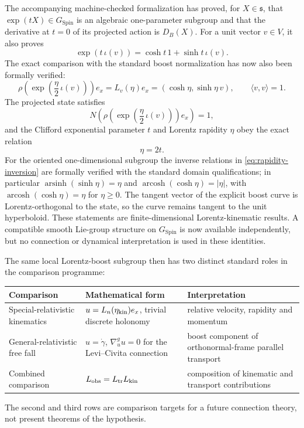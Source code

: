 \documentclass[11pt,a4paper]{article}
\theoremstyle{remark}
\newcommand{\SpinG}{G_{\mathrm{Spin}}}
\begin{document}
The accompanying machine-checked formalization has proved, for \(X\in\mathfrak s\), that \(\exp(tX)\in\SpinG\) is an algebraic one-parameter subgroup and that the derivative at \(t=0\) of its projected action is \(D_B(X)\).  For a unit vector \(v\in V\), it also proves
\begin{equation}
  \exp(t\,\iota(v))
  =\cosh t\,1+\sinh t\,\iota(v).
\tag{3.11}\label{eq:grade-one-exp}
\end{equation}
The exact comparison with the standard boost normalization has now also been formally verified:
\begin{equation}
  \rho\!\left(\exp\!\left(\frac{\eta}{2}\,\iota(v)\right)\right)e_x
  =L_v(\eta)e_x
  =(\cosh\eta,\sinh\eta\,v),
  \qquad
  \langle v,v\rangle=1.
\tag{3.12}\label{eq:spin-rapidity-target}
\end{equation}
The projected state satisfies
\[
  N\!\left(\rho\!\left(\exp\!\left(\frac{\eta}{2}\,\iota(v)\right)\right)e_x\right)=1,
\]
and the Clifford exponential parameter \(t\) and Lorentz rapidity \(\eta\) obey the exact relation
\begin{equation}
  \eta=2t.
\tag{3.13}\label{eq:factor-two}
\end{equation}
For the oriented one-dimensional subgroup the inverse relations in \eqref{eq:rapidity-inversion} are formally verified with the standard domain qualifications; in particular \(\operatorname{arsinh}(\sinh\eta)=\eta\) and \(\operatorname{arcosh}(\cosh\eta)=|\eta|\), with \(\operatorname{arcosh}(\cosh\eta)=\eta\) for \(\eta\ge0\).  The tangent vector of the explicit boost curve is Lorentz-orthogonal to the state, so the curve remains tangent to the unit hyperboloid.  These statements are finite-dimensional Lorentz-kinematic results.  A compatible smooth Lie-group structure on \(\SpinG\) is now available independently, but no connection or dynamical interpretation is used in these identities.

The same local Lorentz-boost subgroup then has two distinct standard roles in the comparison programme:
\begin{center}
\small
\begin{tabularx}{\textwidth}{@{}l>{\raggedright\arraybackslash}X>{\raggedright\arraybackslash}X@{}}
\toprule
Comparison & Mathematical form & Interpretation \\
\midrule
Special-relativistic kinematics & \(u=L_n(\eta_{\rm kin})e_x\), trivial discrete holonomy & relative velocity, rapidity and momentum \\
General-relativistic free fall & \(u=\dot\gamma\), \(\nabla^g_u u=0\) for the Levi--Civita connection & boost component of orthonormal-frame parallel transport \\
Combined comparison & \(L_{\rm obs}=L_{\rm tr}L_{\rm kin}\) & composition of kinematic and transport contributions \\
\bottomrule
\end{tabularx}
\normalsize
\end{center}
The second and third rows are comparison targets for a future connection theory, not present theorems of the hypothesis.
\end{document}
